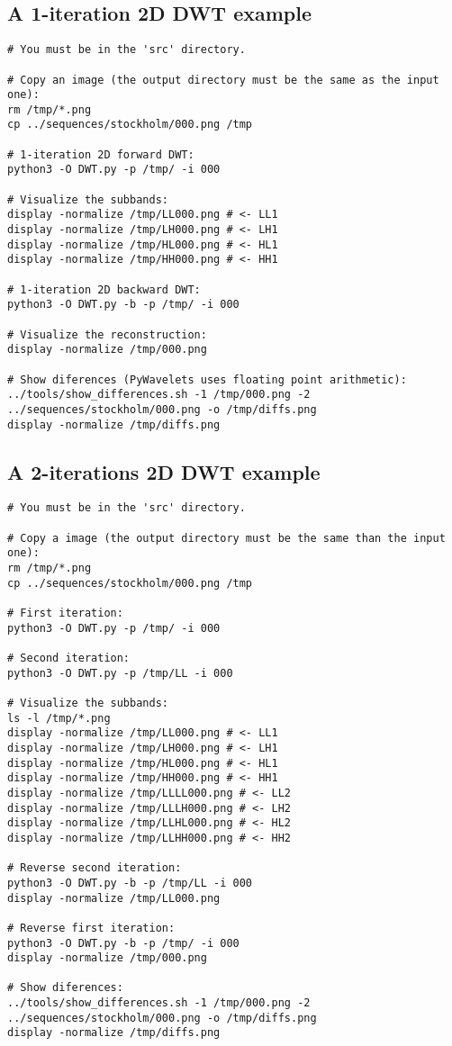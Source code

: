 \subsection{A 1-iteration 2D DWT example}
\begin{verbatim}
# You must be in the 'src' directory.

# Copy an image (the output directory must be the same as the input one):
rm /tmp/*.png
cp ../sequences/stockholm/000.png /tmp

# 1-iteration 2D forward DWT:
python3 -O DWT.py -p /tmp/ -i 000

# Visualize the subbands:
display -normalize /tmp/LL000.png # <- LL1
display -normalize /tmp/LH000.png # <- LH1
display -normalize /tmp/HL000.png # <- HL1
display -normalize /tmp/HH000.png # <- HH1

# 1-iteration 2D backward DWT:
python3 -O DWT.py -b -p /tmp/ -i 000

# Visualize the reconstruction:
display -normalize /tmp/000.png 

# Show diferences (PyWavelets uses floating point arithmetic):
../tools/show_differences.sh -1 /tmp/000.png -2 ../sequences/stockholm/000.png -o /tmp/diffs.png
display -normalize /tmp/diffs.png
\end{verbatim}

\subsection{A 2-iterations 2D DWT example}
\begin{verbatim}
# You must be in the 'src' directory.

# Copy a image (the output directory must be the same than the input one):
rm /tmp/*.png
cp ../sequences/stockholm/000.png /tmp

# First iteration:
python3 -O DWT.py -p /tmp/ -i 000

# Second iteration:
python3 -O DWT.py -p /tmp/LL -i 000

# Visualize the subbands:
ls -l /tmp/*.png
display -normalize /tmp/LL000.png # <- LL1  
display -normalize /tmp/LH000.png # <- LH1  
display -normalize /tmp/HL000.png # <- HL1  
display -normalize /tmp/HH000.png # <- HH1  
display -normalize /tmp/LLLL000.png # <- LL2
display -normalize /tmp/LLLH000.png # <- LH2
display -normalize /tmp/LLHL000.png # <- HL2
display -normalize /tmp/LLHH000.png # <- HH2

# Reverse second iteration:
python3 -O DWT.py -b -p /tmp/LL -i 000
display -normalize /tmp/LL000.png

# Reverse first iteration:
python3 -O DWT.py -b -p /tmp/ -i 000
display -normalize /tmp/000.png

# Show diferences:
../tools/show_differences.sh -1 /tmp/000.png -2 ../sequences/stockholm/000.png -o /tmp/diffs.png
display -normalize /tmp/diffs.png
\end{verbatim}

